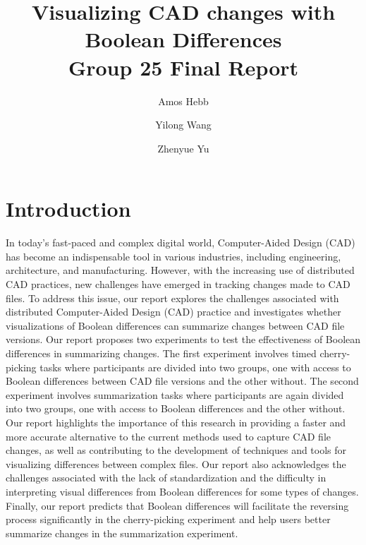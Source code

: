 \documentclass[sigconf,authorversion,nonacm]{acmart}
\begin{document}
\title[Visualizing CAD changes with Boolean Differences]
{Visualizing CAD changes with Boolean Differences\\
	\normalsize{Group 25 Final Report}}

\author{Amos Hebb}
\author{Yilong Wang}
\author{Zhenyue Yu}

\makeatletter
\def\@ACM@checkaffil{%
	\if@ACM@instpresent\else
		\ClassWarningNoLine{\@classname}{No institution present for an affiliation}%
	\fi
	\if@ACM@citypresent\else
		\ClassWarningNoLine{\@classname}{No city present for an affiliation}%
	\fi
	\if@ACM@countrypresent\else
		\ClassWarningNoLine{\@classname}{No country present for an affiliation}%
	\fi
}
\makeatother

\maketitle

\section{Introduction}

In today's fast-paced and complex digital world, Computer-Aided Design (CAD) has become an indispensable tool in various industries, including engineering, architecture, and manufacturing.
However, with the increasing use of distributed CAD practices, new challenges have emerged in tracking changes made to CAD files.
To address this issue, our report explores the challenges associated with distributed Computer-Aided Design (CAD) practice and investigates whether visualizations of Boolean differences can summarize changes between CAD file versions.
Our report proposes two experiments to test the effectiveness of Boolean differences in summarizing changes. The first experiment involves timed cherry-picking tasks where participants are divided into two groups, one with access to Boolean differences between CAD file versions and the other without.
The second experiment involves summarization tasks where participants are again divided into two groups, one with access to Boolean differences and the other without.
Our report highlights the importance of this research in providing a faster and more accurate alternative to the current methods used to capture CAD file changes, as well as contributing to the development of techniques and tools for visualizing differences between complex files. Our report also acknowledges the challenges associated with the lack of standardization and the difficulty in interpreting visual differences from Boolean differences for some types of changes.
Finally, our report predicts that Boolean differences will facilitate the reversing process significantly in the cherry-picking experiment and help users better summarize changes in the summarization experiment.
\end{document}

